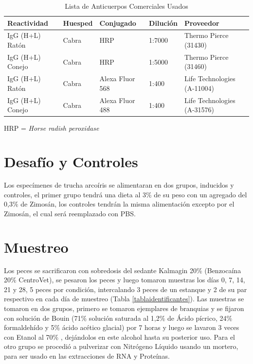 \documentclass[12pt,letterpaper,oneside]{scrbook}
\begin{document}
\begin{table}[h!]
    \begin{center}
        \begin{threeparttable}
            \caption{Lista de Anticuerpos Comerciales Usados}\label{tabla:anticuerpos-comerciales}
                \begin{tabular}{l l l l l}
                \toprule
                Reactividad & Huesped & Conjugado & Dilución & Proveedor \\
                \midrule
                IgG (H+L) Ratón & Cabra & HRP & 1:7000 & Thermo Pierce (31430) \\
                IgG (H+L) Conejo & Cabra & HRP & 1:5000 & Thermo Pierce (31460) \\
                IgG (H+L) Ratón & Cabra & Alexa Fluor 568 & 1:400 & Life Technologies (A-11004) \\
                IgG (H+L) Conejo & Cabra & Alexa Fluor 488 & 1:400 & Life Technologies (A-31576) \\
                \bottomrule
                \end{tabular}
            \begin{tablenotes}
                \item *HRP = \emph{Horse radish peroxidase}
            \end{tablenotes}
        \end{threeparttable}
    \end{center}
\end{table}

\section{Desafío y Controles}

Los especímenes de trucha arcoíris se alimentaran en dos grupos,
inducidos y controles, el primer grupo tendrá una dieta al 3\% de su
peso con un agregado del 0,3\% de Zimosán, los controles tendrán la
misma alimentación excepto por el Zimosán, el cual será reemplazado con
PBS.

\section{Muestreo}

Los peces se sacrificaron con sobredosis del sedante Kalmagin 20\%
(Benzocaína 20\% CentroVet), se pesaron los peces y luego tomaron
muestras los días 0, 7, 14, 21 y 28, 5 peces por condición, intercalando
3 peces de un estanque y 2 de su par respectivo en cada día de muestreo
(Tabla \ref{tablaidentificantes}). Las muestras se tomaron en dos
grupos, primero se tomaron ejemplares de branquias y se fijaron con
solución de Bouin (71\% solución saturada al 1,2\% de Ácido pícrico,
24\% formaldehído y 5\% ácido acético glacial) por 7 horas y luego se
lavaron 3 veces con Etanol al 70\% , dejándolos en este alcohol hasta su
posterior uso. Para el otro grupo se procedió a pulverizar con Nitrógeno
Líquido usando un mortero, para ser usado en las extracciones de RNA y
Proteínas.
\end{document}
